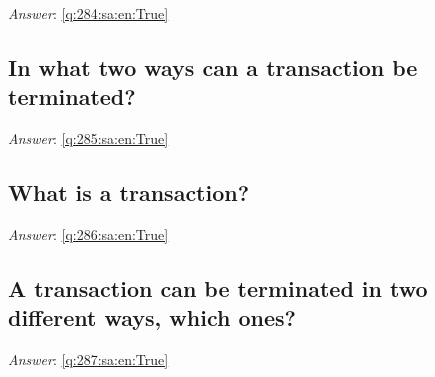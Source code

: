 \documentclass[a4paper,11pt,oneside]{article}
\begin{document}
\begin{sloppypar}
\label{q:284:sa:en:False}

\vspace{2cm}

\noindent\makebox[\textwidth]{\hrulefill}

\vspace{1cm}

\textit{Answer}: \autoref{q:284:sa:en:True}



\subsection{In what two ways can a transaction be terminated?}

\label{q:285:sa:en:False}

\vspace{2cm}

\noindent\makebox[\textwidth]{\hrulefill}

\vspace{1cm}

\textit{Answer}: \autoref{q:285:sa:en:True}



\subsection{What is a transaction?}

\label{q:286:sa:en:False}

\vspace{2cm}

\noindent\makebox[\textwidth]{\hrulefill}

\vspace{1cm}

\textit{Answer}: \autoref{q:286:sa:en:True}



\subsection{A transaction can be terminated in two different ways, which ones?}

\label{q:287:sa:en:False}

\vspace{2cm}

\noindent\makebox[\textwidth]{\hrulefill}

\vspace{1cm}

\textit{Answer}: \autoref{q:287:sa:en:True}




\end{sloppypar}
\end{document}
